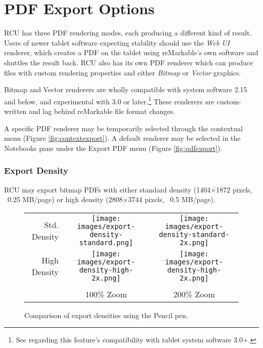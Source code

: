 \newpage

\chapter{PDF Export Options}
\label{sec:render-samples}

RCU has three PDF rendering modes, each producing a different kind of result. Users of newer tablet software expecting stability should use the \textit{Web UI} renderer, which creates a PDF on the tablet using reMarkable's own software and shuttles the result back. RCU also has its own PDF renderer which can produce files with custom rendering properties and either \textit{Bitmap} or \textit{Vector} graphics.

Bitmap and Vector renderers are wholly compatible with system software 2.15 and below, and experimental with 3.0 or later.\footnote{See  regarding this feature's compatibility with tablet system software 3.0+.} These renderers are custom-written and lag behind reMarkable file format changes.

A specific PDF renderer may be temporarily selected through the contextual menu (Figure \ref{fig:contextexport}). A default renderer may be selected in the Notebooks pane under the Export PDF menu (Figure \ref{fig:pdfexport}).

\subsection{Export Density}
RCU may export bitmap PDFs with either standard density (1404$\times$1872 pixels, \break~0.25 MB/page) or high density (2808$\times$3744 pixels, ~0.5 MB/page).

\vspace{0.5cm}
\begin{figure}[h]
\begin{tabular}{ r c c }
  Std. Density & \texttt{[image: images/export-density-standard.png]}  & \texttt{[image: images/export-density-standard-2x.png]}\\
  High Density & \texttt{[image: images/export-density-high-2x.png]} & \texttt{[image: images/export-density-high-2x.png]} \\
  \vspace{0.25cm} & \\
   & 100\% Zoom & 200\% Zoom \\
\end{tabular}
\caption{Comparison of export densities using the Pencil pen.}
\label{fig:exportdensity}
\end{figure}



